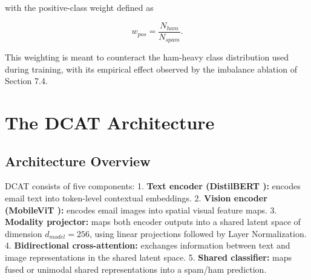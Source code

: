 \documentclass[10pt,twoside]{article}
\begin{document}
with the positive-class weight defined as

\begin{equation}\label{eq:6}
w_{pos} = \frac{N_{ham}}{N_{spam}}.
\end{equation}

This weighting is meant to counteract the ham-heavy class distribution used during training, with its empirical effect observed by the imbalance ablation of Section 7.4.

\section{The DCAT Architecture}\label{sec:5}

\subsection{Architecture Overview}\label{sec:5.1}

DCAT consists of five components: 1. \textbf{Text encoder (DistilBERT \citep{sanh2019distilbert}):} encodes email text into token-level contextual embeddings. 2. \textbf{Vision encoder (MobileViT \citep{mehta2022mobilevit}):} encodes email images into spatial visual feature maps. 3. \textbf{Modality projector:} maps both encoder outputs into a shared latent space of dimension $d_{model} = 256$, using linear projections followed by Layer Normalization. 4. \textbf{Bidirectional cross-attention:} exchanges information between text and image representations in the shared latent space. 5. \textbf{Shared classifier:} maps fused or unimodal shared representations into a spam/ham prediction.
\end{document}
